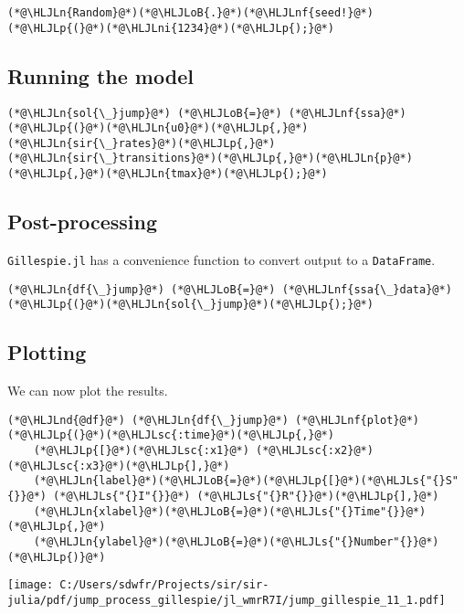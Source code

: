 \documentclass[12pt,a4paper]{article}
\newcommand{\HLJLn}[1]{#1}
\newcommand{\HLJLnd}[1]{\textcolor[RGB]{214,102,97}{#1}}
\newcommand{\HLJLnf}[1]{\textcolor[RGB]{66,102,213}{#1}}
\newcommand{\HLJLs}[1]{\textcolor[RGB]{201,61,57}{#1}}
\newcommand{\HLJLsc}[1]{\textcolor[RGB]{201,61,57}{#1}}
\newcommand{\HLJLni}[1]{\textcolor[RGB]{59,151,46}{#1}}
\newcommand{\HLJLoB}[1]{\textcolor[RGB]{102,102,102}{\textbf{#1}}}
\newcommand{\HLJLp}[1]{#1}
\begin{document}
\begin{lstlisting}
(*@\HLJLn{Random}@*)(*@\HLJLoB{.}@*)(*@\HLJLnf{seed!}@*)(*@\HLJLp{(}@*)(*@\HLJLni{1234}@*)(*@\HLJLp{);}@*)
\end{lstlisting}


\subsection{Running the model}

\begin{lstlisting}
(*@\HLJLn{sol{\_}jump}@*) (*@\HLJLoB{=}@*) (*@\HLJLnf{ssa}@*)(*@\HLJLp{(}@*)(*@\HLJLn{u0}@*)(*@\HLJLp{,}@*)(*@\HLJLn{sir{\_}rates}@*)(*@\HLJLp{,}@*)(*@\HLJLn{sir{\_}transitions}@*)(*@\HLJLp{,}@*)(*@\HLJLn{p}@*)(*@\HLJLp{,}@*)(*@\HLJLn{tmax}@*)(*@\HLJLp{);}@*)
\end{lstlisting}


\subsection{Post-processing}
\texttt{Gillespie.jl} has a convenience function to convert output to a \texttt{DataFrame}.


\begin{lstlisting}
(*@\HLJLn{df{\_}jump}@*) (*@\HLJLoB{=}@*) (*@\HLJLnf{ssa{\_}data}@*)(*@\HLJLp{(}@*)(*@\HLJLn{sol{\_}jump}@*)(*@\HLJLp{);}@*)
\end{lstlisting}


\subsection{Plotting}
We can now plot the results.


\begin{lstlisting}
(*@\HLJLnd{@df}@*) (*@\HLJLn{df{\_}jump}@*) (*@\HLJLnf{plot}@*)(*@\HLJLp{(}@*)(*@\HLJLsc{:time}@*)(*@\HLJLp{,}@*)
    (*@\HLJLp{[}@*)(*@\HLJLsc{:x1}@*) (*@\HLJLsc{:x2}@*) (*@\HLJLsc{:x3}@*)(*@\HLJLp{],}@*)
    (*@\HLJLn{label}@*)(*@\HLJLoB{=}@*)(*@\HLJLp{[}@*)(*@\HLJLs{"{}S"{}}@*) (*@\HLJLs{"{}I"{}}@*) (*@\HLJLs{"{}R"{}}@*)(*@\HLJLp{],}@*)
    (*@\HLJLn{xlabel}@*)(*@\HLJLoB{=}@*)(*@\HLJLs{"{}Time"{}}@*)(*@\HLJLp{,}@*)
    (*@\HLJLn{ylabel}@*)(*@\HLJLoB{=}@*)(*@\HLJLs{"{}Number"{}}@*)(*@\HLJLp{)}@*)
\end{lstlisting}

\texttt{[image: C:/Users/sdwfr/Projects/sir/sir-julia/pdf/jump\_process\_gillespie/jl\_wmrR7I/jump\_gillespie\_11\_1.pdf]}
\end{document}
